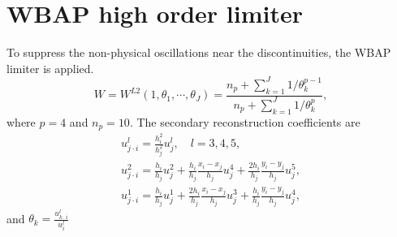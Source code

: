 \documentclass[review]{elsarticle}
\begin{document}
\section{WBAP high order limiter}
	To suppress the non-physical oscillations near the discontinuities, the WBAP limiter is applied.
	\begin{equation}\label{eq:wbap}
		W=W^{L2}(1, \theta_1, \cdots, \theta_J)=\frac{n_p+\sum_{k=1}^{J}{1/\theta_{k}^{p-1}}}{n_p+\sum_{k=1}^{J}{1/\theta_{k}^{p}}},
	\end{equation}
	where $p = 4$ and $n_p = 10$.
	The secondary reconstruction coefficients are
	\begin{equation}\label{eq:uji}
		\begin{gathered}
			u_{j \cdot i}^l=\frac{h_i^2}{h_j^2}u_j^l, \quad l=3,4,5,\\
			u_{j \cdot i}^2=\frac{h_i}{h_j}u_j^2+\frac{h_i}{h_j}\frac{x_i-x_j}{h_j}u_j^4
				+\frac{2h_i}{h_j}\frac{y_i-y_j}{h_j}u_j^5,\\
			u_{j \cdot i}^1=\frac{h_i}{h_j}u_j^1+\frac{2h_i}{h_j}\frac{x_i-x_j}{h_j}u_j^3
			+\frac{h_i}{h_j}\frac{y_i-y_j}{h_j}u_j^4,
		\end{gathered}
	\end{equation}
	and $\theta_k = \frac{u_{k \cdot i}^l}{u_i^l}$
\end{document}
